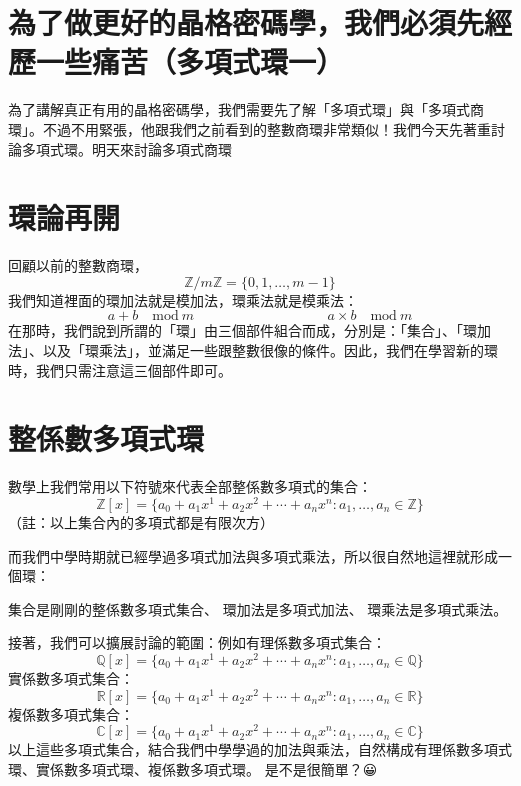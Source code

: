 \documentclass[
]{article}
\author{}
\date{}
\begin{document}
\hypertarget{ux70baux4e86ux505aux66f4ux597dux7684ux6676ux683cux5bc6ux78bcux5b78ux6211ux5011ux5fc5ux9808ux5148ux7d93ux6b77ux4e00ux4e9bux75dbux82e6ux591aux9805ux5f0fux74b0ux4e00}{%
\section{為了做更好的晶格密碼學，我們必須先經歷一些痛苦（多項式環一）}\label{ux70baux4e86ux505aux66f4ux597dux7684ux6676ux683cux5bc6ux78bcux5b78ux6211ux5011ux5fc5ux9808ux5148ux7d93ux6b77ux4e00ux4e9bux75dbux82e6ux591aux9805ux5f0fux74b0ux4e00}}

為了講解真正有用的晶格密碼學，我們需要先了解「多項式環」與「多項式商環」。不過不用緊張，他跟我們之前看到的整數商環非常類似！我們今天先著重討論多項式環。明天來討論多項式商環

\hypertarget{ux74b0ux8ad6ux518dux958b}{%
\section{環論再開}\label{ux74b0ux8ad6ux518dux958b}}

回顧以前的整數商環， \[
\mathbb{Z}/m\mathbb{Z}=\{0,1,\dots,m-1\}
\] 我們知道裡面的環加法就是模加法，環乘法就是模乘法： \[
a+b\quad \mathrm{mod} \ m \hspace{4cm}
a\times  b\quad \mathrm{mod} \  m 
\]
在那時，我們說到所謂的「環」由三個部件組合而成，分別是：「集合」、「環加法」、以及「環乘法」，並滿足一些跟整數很像的條件。因此，我們在學習新的環時，我們只需注意這三個部件即可。

\hypertarget{ux6574ux4fc2ux6578ux591aux9805ux5f0fux74b0}{%
\section{整係數多項式環}\label{ux6574ux4fc2ux6578ux591aux9805ux5f0fux74b0}}

數學上我們常用以下符號來代表全部整係數多項式的集合： \[
\mathbb{Z}[x]  =\{ a_{0}+a_{1}x^{1}+a_{2}x^{2}+\cdots+a_{n}x^n : a_{1},\dots,a_{n}\in \mathbb{Z}  \}
\] （註：以上集合內的多項式都是有限次方）

而我們中學時期就已經學過多項式加法與多項式乘法，所以很自然地這裡就形成一個環：

集合是剛剛的整係數多項式集合、 環加法是多項式加法、 環乘法是多項式乘法。

接著，我們可以擴展討論的範圍：例如有理係數多項式集合： \[
\mathbb{Q}[x]  =\{ a_{0}+a_{1}x^{1}+a_{2}x^{2}+\cdots+a_{n}x^n : a_{1},\dots,a_{n}\in \mathbb{Q}  \}
\] 實係數多項式集合： \[
\mathbb{R}[x]  =\{ a_{0}+a_{1}x^{1}+a_{2}x^{2}+\cdots+a_{n}x^n : a_{1},\dots,a_{n}\in \mathbb{R}  \}
\] 複係數多項式集合： \[
\mathbb{C}[x]  =\{ a_{0}+a_{1}x^{1}+a_{2}x^{2}+\cdots+a_{n}x^n : a_{1},\dots,a_{n}\in \mathbb{C}  \}
\]
以上這些多項式集合，結合我們中學學過的加法與乘法，自然構成有理係數多項式環、實係數多項式環、複係數多項式環。
是不是很簡單？😀
\end{document}
